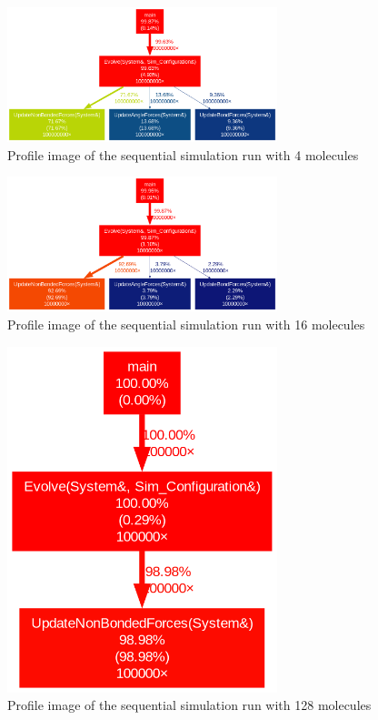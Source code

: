 \documentclass{article}
\begin{document}
\begin{figure}
    \includegraphics[width=0.7\textwidth]{Images/vec_4mol_profile.png}
    \centering
    \caption{Profile image of the sequential simulation run with 4 molecules}
    \label{fig: seq profile 4 molecule}
\end{figure}
\begin{figure}
    \includegraphics[width=0.7\textwidth]{Images/seq_16mol_profile.png
    }
    \centering
    \caption{Profile image of the sequential simulation run with 16 molecules}
    \label{fig: seq profile 16 molecule}
\end{figure}
\begin{figure}
    \includegraphics[width=0.7\textwidth]{Images/seq_128mol_profile.png
    }
    \centering
    \caption{Profile image of the sequential simulation run with 128 molecules}
    \label{fig: seq profile 128 molecule}
\end{figure}
\end{document}
